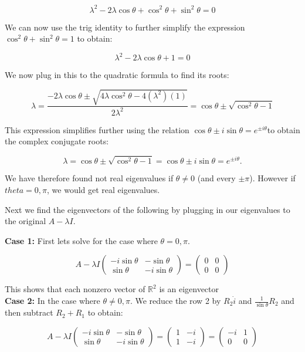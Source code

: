 \documentclass{article}
\begin{document}
$$
\lambda ^{2}-2 \lambda \cos \theta + \cos ^{2} \theta + \sin ^{2} \theta = 0
$$

We can now use the trig identity to further simplify the expression $ \cos ^{2} \theta + \sin ^{2} \theta = 1$ to obtain: 

$$
\lambda ^{2}-2 \lambda \cos \theta + 1 = 0
$$

We now plug in this to the quadratic formula to find its roots:

$$
\lambda = \frac{-2 \lambda \cos \theta \pm \sqrt{4 \lambda \cos ^{2} \theta - 4(\lambda ^{2})(1)}}{2 \lambda ^{2}} = \cos \theta \pm \sqrt{\cos ^{2} \theta -1 } 
$$

This expression simplifies further using the relation $\cos \theta \pm i \sin \theta = e^{\pm i \theta}$to obtain the complex conjugate roots:

$$
\lambda = \cos \theta \pm \sqrt{\cos ^{2} \theta -1 } = \cos \theta \pm i \sin \theta = e^{\pm i \theta}.
$$

We have therefore found not real eigenvalues if $\theta \neq 0$ (and every $\pm \pi$). However if $theta = 0, \pi$, we would get real eigenvalues.

Next we find the eigenvectors of the following by plugging in our eigenvalues to the original $A- \lambda I$.

\textbf{Case 1:} First lets solve for the case where $\theta = 0, \pi$.

$$
A - \lambda I
\begin{pmatrix}
 -i \sin \theta & -\sin \theta \\
\sin \theta & -i \sin \theta 
\end{pmatrix} = 
\begin{pmatrix}
 0 & 0 \\
0 & 0 
\end{pmatrix} 
$$

This shows that each nonzero vector of $\mathbb{R}^{2}$ is an eigenvector \\

\textbf{Case 2:} In the case where $ \theta \neq 0, \pi$. We reduce the row 2 by $R_2 \dot i$ and $\frac{1}{\sin \theta} R_2$ and then subtract $R_2 + R_1$ to obtain: 

$$
A - \lambda I
\begin{pmatrix}
 -i \sin \theta & -\sin \theta \\
\sin \theta & -i \sin \theta 
\end{pmatrix} = 
\begin{pmatrix}
 1 & -i \\
1 & -i 
\end{pmatrix} =
\begin{pmatrix}
 -i & 1 \\
0 & 0 
\end{pmatrix}
$$
\end{document}
